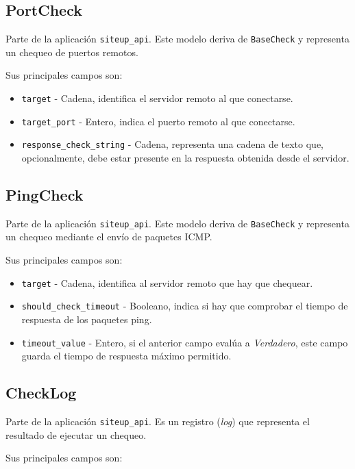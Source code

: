 \subsection{PortCheck}

Parte de la aplicación \texttt{siteup\_api}. Este modelo deriva de
\texttt{BaseCheck} y representa un chequeo de puertos remotos.

Sus principales campos son:

\begin{itemize}
\item \texttt{target} - Cadena, identifica el servidor remoto al que conectarse.
\item \texttt{target\_port} - Entero, indica el puerto remoto al que conectarse.
\item \texttt{response\_check\_string} - Cadena, representa una cadena de texto
  que, opcionalmente, debe estar presente en la respuesta obtenida desde el servidor.
\end{itemize}

\subsection{PingCheck}

Parte de la aplicación \texttt{siteup\_api}. Este modelo deriva de
\texttt{BaseCheck} y representa un chequeo mediante el envío de paquetes \ac{ICMP}.

Sus principales campos son:

\begin{itemize}
\item \texttt{target} - Cadena, identifica al servidor remoto que hay que chequear.
\item \texttt{should\_check\_timeout} - Booleano, indica si hay que comprobar el tiempo de respuesta de los paquetes ping.
\item \texttt{timeout\_value} - Entero, si el anterior campo evalúa a
  \textit{Verdadero}, este campo guarda el tiempo de respuesta máximo permitido.
\end{itemize}

\subsection{CheckLog}

Parte de la aplicación \texttt{siteup\_api}. Es un registro (\textit{log}) que
representa el resultado de ejecutar un chequeo.

Sus principales campos son:

